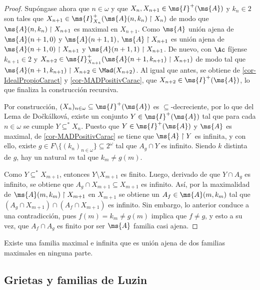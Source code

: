 \begin{proof}
		Supóngase ahora que $n \in \omega$ y que $X_n, X_{n+1} \in \ms{I}^+(\ms{A})$ y $k_n \in 2$ son tales que $X_{n+1} \in \ms{I}_{X_n}^+ ( \ms{A}(n,k_n) \upharpoonright X_n )$ de modo que $\ms{A}(n,k_n) \upharpoonright X_{n+1}$ es maximal en $X_{n+1}$. Como $\ms{A}$ unión ajena de $\ms{A}(n+1,0)$ y $\ms{A}(n+1,1)$, $\ms{A} \upharpoonright X_{n+1}$ es unión ajena de $\ms{A}(n+1,0) \upharpoonright X_{n+1}$ y $\ms{A}(n+1,1) \upharpoonright X_{n+1}$. De nuevo, con $\Ac$ fíjense $k_{n+1}\in 2$ y $X_{n+2} \in \ms{I}_{X_{n+1}}^+ ( \ms{A}(n+1,k_{n+1}) \upharpoonright X_{n+1} )$ de modo tal que $\ms{A}(n+1,k_{n+1}) \upharpoonright X_{n+2} \in \Mad(X_{n+2})$. Al igual que antes, se obtiene de \ref{cor-IdealPropioCaract} y \ref{cor-MADPositivCarac}, que $X_{n+2} \in \ms{I}^+(\ms{A})$, lo que finaliza la construcción recursiva.
		
		Por construcción, $(X_n)_{n\in \omega} \subseteq \ms{I}^+(\ms{A})$ es $\subseteq$-decreciente, por lo que del Lema de Dočkálková, existe un conjunto $Y \in \ms{I}^+(\ms{A})$ tal que para cada $n \in \omega$ se cumple $Y \subseteq^* X_n$. Puesto que $Y \in \ms{I}^+(\ms{A})$ y $\ms{A}$ es maximal, de \ref{cor-MADPositivCarac} se tiene que $\ms{A} \upharpoonright Y$ es infinita, y con ello, existe $g \in F \setminus \{(k_n)_{n \in \omega}\} \subseteq 2^\omega$ tal que $A_g \cap Y$ es infinito. Siendo $k$ distinta de $g$, hay un natural $m$ tal que $k_m \neq g(m)$.
		
		Como $Y \subseteq^* X_{m+1}$, entonces $Y \setminus X_{m+1}$ es finito. Luego, derivado de que $Y \cap A_g$ es infinito, se obtiene que $A_g \cap X_{m+1} \subseteq X_{m+1}$ es infinito. Así, por la maximalidad de $\ms{A}(m,k_m) \upharpoonright X_{m+1}$ en $X_{m+1}$ se obtiene un $A_f \in \ms{A}(m,k_m)$ tal que $(A_g \cap X_{m+1}) \cap (A_f \cap X_{m+1})$ es infinito. Sin embargo, lo anterior conduce a una contradicción, pues $f(m)=k_m \neq g(m)$ implica que $f \neq g$, y esto a su vez, que $A_f \cap A_g$ es finito por ser $\ms{A}$ familia casi ajena. 
	\end{proof} 
		
	\begin{corolario}
		Existe una familia maximal e infinita que es unión ajena de dos familias maximales en ninguna parte.
	\end{corolario}

	\subsection{Grietas y familias de Luzin}
	\label{Sec-Luzin}


